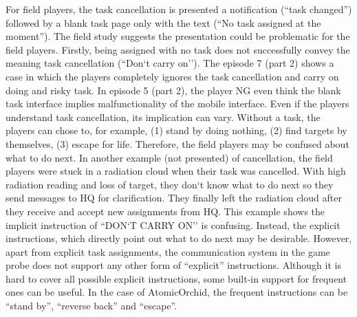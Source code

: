 For field players, the task cancellation is presented a notification (``task changed'') followed by a blank task page only with the text (``No task assigned at the moment''). The field study suggests the presentation could be problematic for the field players. Firstly, being assigned with no task does not successfully convey the meaning task cancellation (``Don`t carry on''). The episode 7 (part 2) shows a case in which the players completely ignores the task cancellation and carry on doing and risky task. In episode 5 (part 2), the player NG even think the blank task interface implies malfunctionality of the mobile interface. Even if the players understand task cancellation, its implication can vary. Without a task, the players can chose to, for example, (1) stand by doing nothing, (2) find targets by themselves, (3) escape for life. Therefore, the field players may be confused about what to do next. In another example (not presented) of cancellation, the field players were stuck in a radiation cloud when their task was cancelled. With high radiation reading and loss of target, they don`t know what to do next so they send messages to HQ for clarification. They finally left the radiation cloud after they receive and accept new assignments from HQ. This example shows the implicit instruction of ``DON`T CARRY ON'' is confusing. Instead, the explicit instructions, which directly point out what to do next may be desirable. However, apart from explicit task assignments, the communication system in the game probe does not support any other form of ``explicit'' instructions. Although it is hard to cover all possible explicit instructions, some built-in support for frequent ones can be useful.  In the case of AtomicOrchid, the frequent instructions can be ``stand by'', ``reverse back'' and ``escape''. \\
	 
